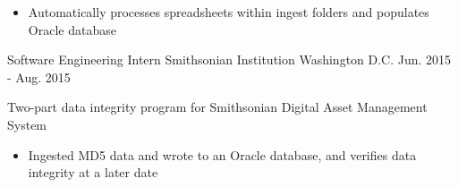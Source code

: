 \begin{cventries}
{\begin{cvitems}
        \begin{itemize}
			\item{Automatically processes spreadsheets within ingest folders and populates Oracle database}
        \end{itemize}
        \end{cvitems}
    }
    \cventry
    {Software Engineering Intern}
    {Smithsonian Institution}
    {Washington D.C.}
    {Jun. 2015 - Aug. 2015}
    {
      \begin{cvitems}
	  \item {Two-part data integrity program for Smithsonian Digital Asset Management System}
        \begin{itemize}
			\item {Ingested MD5 data and wrote to an Oracle database, and verifies data integrity at a later date}
        \end{itemize}
      \end{cvitems}
    }
	\vspace{-1.0em}
\end{cventries}
